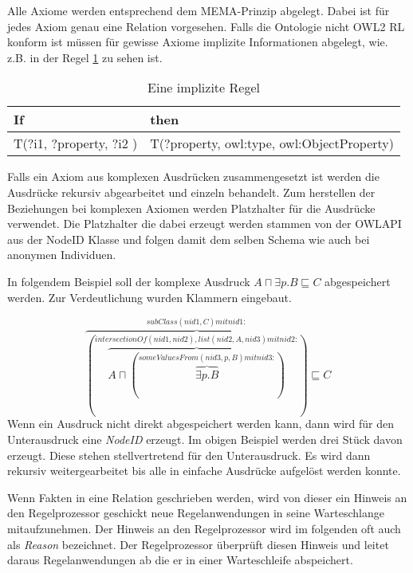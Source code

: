 Alle Axiome werden entsprechend dem MEMA-Prinzip abgelegt. Dabei ist für jedes Axiom genau eine Relation vorgesehen. Falls die Ontologie nicht OWL2 RL konform ist müssen für gewisse Axiome implizite Informationen abgelegt, wie. z.B. in der Regel \ref{rule-impl} zu sehen ist.

\begin{table}[htp]
	\caption{Eine implizite Regel}
	\label{rule-impl}
\begin{center}
	\begin{tabular}{l|l}
    If & then \\ \hline
	T(?i1, ?property, ?i2 ) & T(?property, owl:type, owl:ObjectProperty) \\
   \end{tabular}
\end{center}
\end{table}


Falls ein Axiom aus komplexen Ausdrücken zusammengesetzt ist werden die Ausdrücke rekursiv abgearbeitet und einzeln behandelt. Zum herstellen der Beziehungen bei komplexen Axiomen werden Platzhalter für die Ausdrücke verwendet. Die Platzhalter die dabei erzeugt werden stammen von der OWLAPI aus der NodeID Klasse und folgen damit dem selben Schema wie auch bei anonymen Individuen.

In folgendem Beispiel soll der komplexe Ausdruck $A \sqcap \exists p.B \sqsubseteq C$ abgespeichert werden. Zur Verdeutlichung wurden Klammern eingebaut.

\begin{equation}
\overbrace{
	(\overbrace{A \sqcap (
		\overbrace{\exists{}p.B}
		^{someValuesFrom(nid3, p, B) mit nid3:})}
	^{intersectionOf(nid1, nid2), list(nid2, A, nid3) mit nid2:})}
^{subClass(nid1, C) mit nid1:} \sqsubseteq C
\end{equation}
Wenn ein Ausdruck nicht direkt abgespeichert werden kann, dann wird für den Unterausdruck eine \emph{NodeID} erzeugt. Im obigen Beispiel werden drei Stück davon erzeugt. Diese stehen stellvertretend für den Unterausdruck. Es wird dann rekursiv weitergearbeitet bis alle in einfache Ausdrücke aufgelöst werden konnte.

Wenn Fakten in eine Relation geschrieben werden, wird von dieser ein Hinweis an den Regelprozessor geschickt neue Regelanwendungen in seine Warteschlange mitaufzunehmen. Der Hinweis an den Regelprozessor wird im folgenden oft auch als \emph{Reason} bezeichnet.
Der Regelprozessor überprüft diesen Hinweis und leitet daraus Regelanwendungen ab die er in einer Warteschleife abspeichert.

